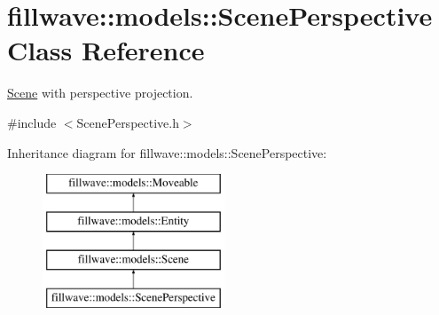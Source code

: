 \hypertarget{classfillwave_1_1models_1_1ScenePerspective}{}\section{fillwave\+:\+:models\+:\+:Scene\+Perspective Class Reference}
\label{classfillwave_1_1models_1_1ScenePerspective}


\hyperlink{classfillwave_1_1models_1_1Scene}{Scene} with perspective projection.  




{\ttfamily \#include $<$Scene\+Perspective.\+h$>$}

Inheritance diagram for fillwave\+:\+:models\+:\+:Scene\+Perspective\+:\begin{figure}[H]
\begin{center}
\leavevmode
\includegraphics[height=4.000000cm]{classfillwave_1_1models_1_1ScenePerspective}
\end{center}
\end{figure}
